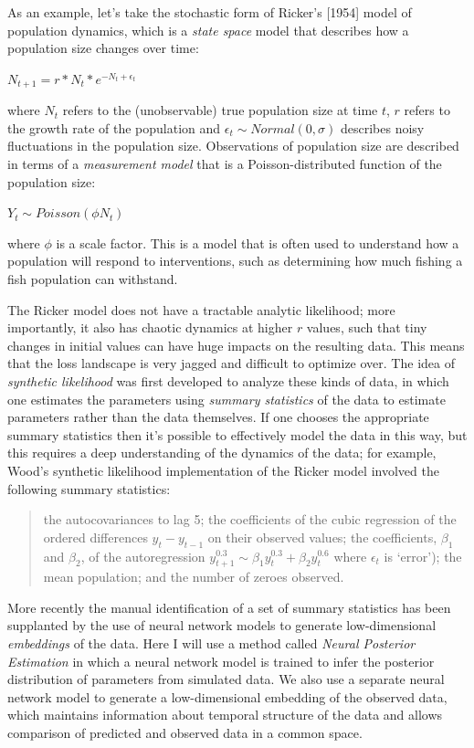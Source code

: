 As an example, let's take the stochastic form of Ricker's [1954] model of population dynamics, which is a \textit{state space} model that describes how a population size changes over time:

$N_{t+1} = r * N_t * e^{-N_t + \epsilon_t}$

where $N_t$ refers to the (unobservable) true population size at time $t$, $r$ refers to the growth rate of the population and $\epsilon_t \sim Normal(0, \sigma)$ describes noisy fluctuations in the population size.  Observations of population size are described in terms of a \textit{measurement model} that is a Poisson-distributed function of the population size:

$Y_t \sim Poisson(\phi N_t)$

where $\phi$ is a scale factor.  This is a model that is often used to understand how a population will respond to interventions, such as determining how much fishing a fish population can withstand.

The Ricker model does not have a tractable analytic likelihood; more importantly, it also has chaotic dynamics at higher $r$ values, such that tiny changes in initial values can have huge impacts on the resulting data.  This means that the loss landscape is very jagged and difficult to optimize over.  The idea of \textit{synthetic likelihood} was first developed to analyze these kinds of data, in which one estimates the parameters using \textit{summary statistics} of the data to estimate parameters rather than the data themselves.  If one chooses the appropriate summary statistics then it's possible to effectively model the data in this way, but this requires a deep understanding of the dynamics of the data; for example, Wood's \citep{Wood:2010aa} synthetic likelihood implementation of the Ricker model involved the following summary statistics:

\begin{quote}
the autocovariances to lag 5; the coefficients of the cubic regression of the ordered differences $y_t - y_{t-1}$ on their observed values; the coefficients, $\beta_1$ and $\beta_2$, of the autoregression  $y_{t+1}^{0.3} \sim \beta_1 y_t^{0.3} + \beta_2 y_t^{0.6}$ where $\epsilon_t$ is `error'); the mean population; and the number of zeroes observed.
\end{quote}

More recently the manual identification of a set of summary statistics has been supplanted by the use of neural network models to generate low-dimensional \textit{embeddings} of the data.  Here I will use a method called \textit{Neural Posterior Estimation} \citep{greenberg:2019} in which a neural network model is trained to infer the posterior distribution of parameters from simulated data.  We also use a separate neural network model to generate a low-dimensional embedding of the observed data, which maintains information about temporal structure of the data and allows comparison of predicted and observed data in a common space.

